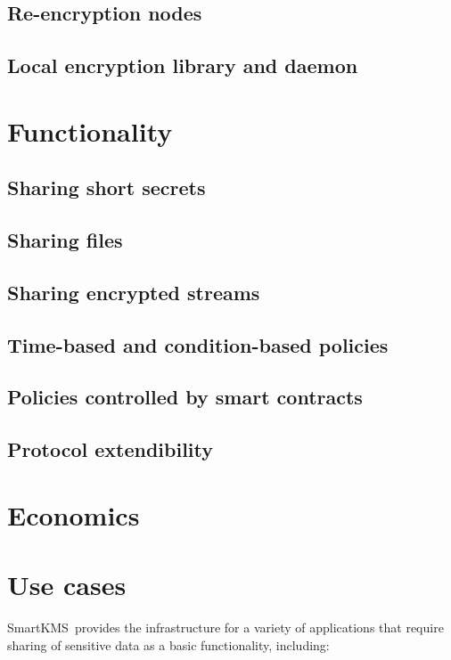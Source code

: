 \documentclass[notitlepage,longbibliography]{revtex4-1}
\newcommand{\kms}{SmartKMS}
\begin{document}
\subsection{Re-encryption nodes}

\subsection{Local encryption library and daemon}

\section{Functionality}

\subsection{Sharing short secrets}

\subsection{Sharing files}

\subsection{Sharing encrypted streams}

\subsection{Time-based and condition-based policies}

\subsection{Policies controlled by smart contracts}

\subsection{Protocol extendibility}

\section{Economics}

\section{Use cases}
\kms~provides the infrastructure for a variety of applications that require sharing of sensitive data as a basic
functionality, including:
\end{document}
